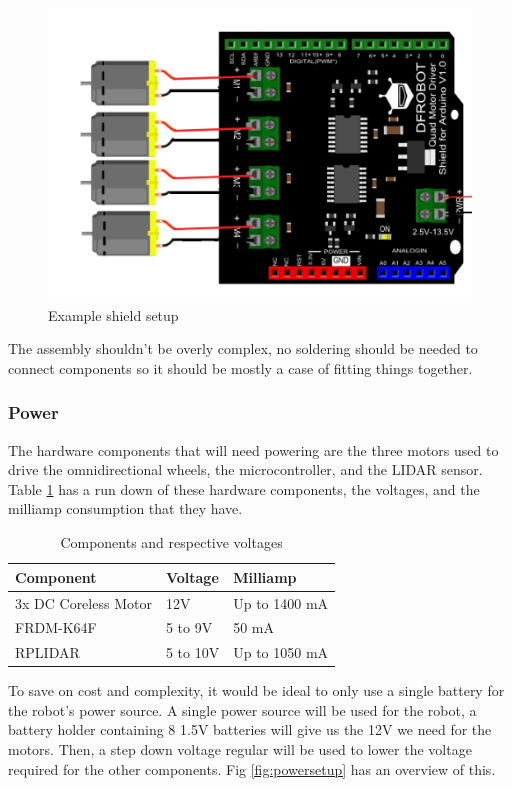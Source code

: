 				\begin{figure}[h]
					\centering
					\includegraphics[width=.7\linewidth]{SYNTHESIS/shield_connection.png}
					\caption{Example shield setup}
					\label{fig:shieldsetup}
				\end{figure}
				
				The assembly shouldn't be overly complex, no soldering should be needed to connect components so it should be mostly a case of fitting things together.
				
				\subsubsection{Power}
				The hardware components that will need powering are the three motors used to drive the omnidirectional wheels, the microcontroller, and the LIDAR sensor. Table \ref{table:1} has a run down of these hardware components, the voltages, and the milliamp consumption that they have.
				
				\begin{table}[h]
					\centering
					\begin{tabular}{|| l | l | l ||} 
						\hline
						Component & Voltage & Milliamp \\ [0.5ex] 
						\hline
						3x DC Coreless Motor  & 12V & Up to 1400 mA  \\ 
						FRDM-K64F  & 5 to 9V &  50 mA \\
						RPLIDAR  & 5 to 10V & Up to 1050 mA\\
						\hline
					\end{tabular}
					\caption{Components and respective voltages}
					\label{table:1}
				\end{table}
				
				To save on cost and complexity, it would be ideal to only use a single battery for the robot's power source. A single power source will be used for the robot, a battery holder containing 8 1.5V batteries will give us the 12V we need for the motors. Then, a step down voltage regular will be used to lower the voltage required for the other components. Fig \ref{fig:powersetup} has an overview of this.
				
